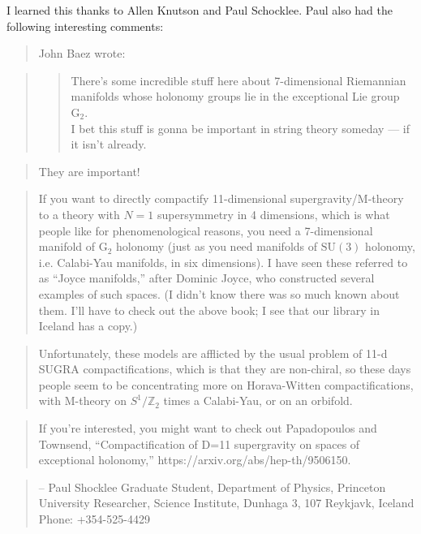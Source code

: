 \documentclass{article}
\begin{document}
I learned this thanks to Allen Knutson and Paul Schocklee. Paul also had
the following interesting comments:

\begin{quote}
John Baez wrote:
\end{quote}

\begin{quote}
\begin{quote}
There's some incredible stuff here about 7-dimensional Riemannian
manifolds whose holonomy groups lie in the exceptional Lie group
\(\mathrm{G}_2\).\\
I bet this stuff is gonna be important in string theory someday --- if
it isn't already.
\end{quote}
\end{quote}

\begin{quote}
They are important!
\end{quote}

\begin{quote}
If you want to directly compactify 11-dimensional supergravity/M-theory
to a theory with \(N=1\) supersymmetry in 4 dimensions, which is what
people like for phenomenological reasons, you need a 7-dimensional
manifold of \(\mathrm{G}_2\) holonomy (just as you need manifolds of
\(\mathrm{SU}(3)\) holonomy, i.e. Calabi-Yau manifolds, in six
dimensions). I have seen these referred to as ``Joyce manifolds,'' after
Dominic Joyce, who constructed several examples of such spaces. (I
didn't know there was so much known about them. I'll have to check out
the above book; I see that our library in Iceland has a copy.)
\end{quote}

\begin{quote}
Unfortunately, these models are afflicted by the usual problem of 11-d
SUGRA compactifications, which is that they are non-chiral, so these
days people seem to be concentrating more on Horava-Witten
compactifications, with M-theory on \(S^1/\mathbb{Z}_2\) times a
Calabi-Yau, or on an orbifold.
\end{quote}

\begin{quote}
If you're interested, you might want to check out Papadopoulos and
Townsend, ``Compactification of D=11 supergravity on spaces of
exceptional holonomy,'' https://arxiv.org/abs/hep-th/9506150.
\end{quote}

\begin{quote}
-- Paul Shocklee Graduate Student, Department of Physics, Princeton
University Researcher, Science Institute, Dunhaga 3, 107 Reykjavk,
Iceland Phone: +354-525-4429
\end{quote}
\end{document}
